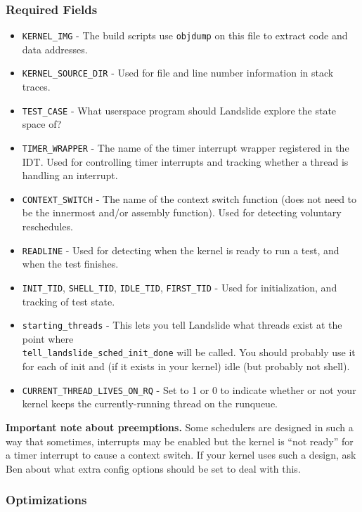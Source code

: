 \documentclass{article}
\begin{document}
\subsubsection{Required Fields}
\begin{itemize}
	\item \texttt{KERNEL\_IMG} - The build scripts use \texttt{objdump} on this file to extract code and data addresses.
	\item \texttt{KERNEL\_SOURCE\_DIR} - Used for file and line number information in stack traces.
	\item \texttt{TEST\_CASE} - What userspace program should Landslide explore the state space of?
	\item \texttt{TIMER\_WRAPPER} - The name of the timer interrupt wrapper registered in the IDT. Used for controlling timer interrupts and tracking whether a thread is handling an interrupt.
	\item \texttt{CONTEXT\_SWITCH} - The name of the context switch function (does not need to be the innermost and/or assembly function). Used for detecting voluntary reschedules.
	\item \texttt{READLINE} - Used for detecting when the kernel is ready to run a test, and when the test finishes.
	\item \texttt{INIT\_TID}, \texttt{SHELL\_TID}, \texttt{IDLE\_TID}, \texttt{FIRST\_TID} - Used for initialization, and tracking of test state.
	\item \texttt{starting\_threads} - This lets you tell Landslide what threads exist at the point where \\ \texttt{tell\_landslide\_sched\_init\_done} will be called. You should probably use it for each of init and (if it exists in your kernel) idle (but probably not shell).
	\item \texttt{CURRENT\_THREAD\_LIVES\_ON\_RQ} - Set to 1 or 0 to indicate whether or not your kernel keeps the currently-running thread on the runqueue.
\end{itemize}

{\bf Important note about preemptions.} Some schedulers are designed in such a way that sometimes, interrupts may be enabled but the kernel is ``not ready'' for a timer interrupt to cause a context switch. If your kernel uses such a design, ask Ben about what extra config options should be set to deal with this.

\subsubsection{Optimizations}
\end{document}
